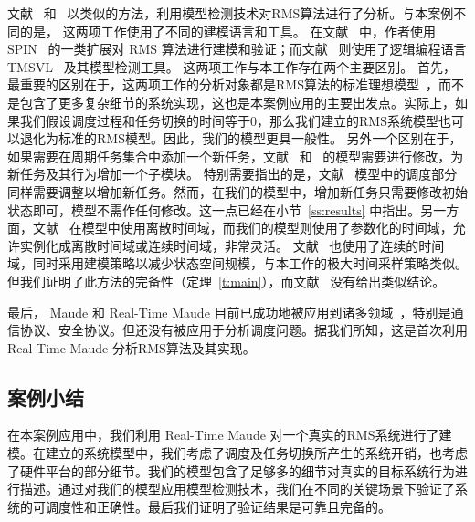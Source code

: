 文献~ 和~ 以类似的方法，利用模型检测技术对RMS算法进行了分析。与本案例不同的是，
这两项工作使用了不同的建模语言和工具。
在文献~ 中，作者使用 SPIN~\cite{DBLP:journals/tse/Holzmann97} 的一类扩展对 RMS 算法进行建模和验证；而文献~ 则使用了逻辑编程语言 TMSVL~\cite{DBLP:conf/icfem/HanDW12} 及其模型检测工具。
这两项工作与本工作存在两个主要区别。
首先，最重要的区别在于，这两项工作的分析对象都是RMS算法的标准理想模型~\cite{DBLP:journals/jacm/LiuL73}，而不是包含了更多复杂细节的系统实现，这也是本案例应用的主要出发点。实际上，如果我们假设调度过程和任务切换的时间等于0，那么我们建立的RMS系统模型也可以退化为标准的RMS模型。因此，我们的模型更具一般性。
另外一个区别在于，如果需要在周期任务集合中添加一个新任务，文献~ 和~ 的模型需要进行修改，为新任务及其行为增加一个子模块。
特别需要指出的是，文献~ 模型中的调度部分同样需要调整以增加新任务。然而，在我们的模型中，增加新任务只需要修改初始状态即可，模型不需作任何修改。这一点已经在小节~\ref{ss:results} 中指出。另一方面，文献~ 在模型中使用离散时间域，而我们的模型则使用了参数化的时间域，允许实例化成离散时间域或连续时间域，非常灵活。 文献~ 也使用了连续的时间域，同时采用建模策略以减少状态空间规模，与本工作的极大时间采样策略类似。但我们证明了此方法的完备性（定理~\ref{t:main}），而文献~ 没有给出类似结论。

最后， Maude 和 Real-Time Maude 目前已成功地被应用到诸多领域~\cite{DBLP:journals/jlp/Meseguer12}，特别是通信协议、安全协议。但还没有被应用于分析调度问题。据我们所知，这是首次利用 Real-Time Maude 分析RMS算法及其实现。


\subsection{案例小结}
\label{s:conclusion}
在本案例应用中，我们利用 Real-Time Maude 对一个真实的RMS系统进行了建模。在建立的系统模型中，我们考虑了调度及任务切换所产生的系统开销，也考虑了硬件平台的部分细节。我们的模型包含了足够多的细节对真实的目标系统行为进行描述。通过对我们的模型应用模型检测技术，我们在不同的关键场景下验证了系统的可调度性和正确性。最后我们证明了验证结果是可靠且完备的。 


